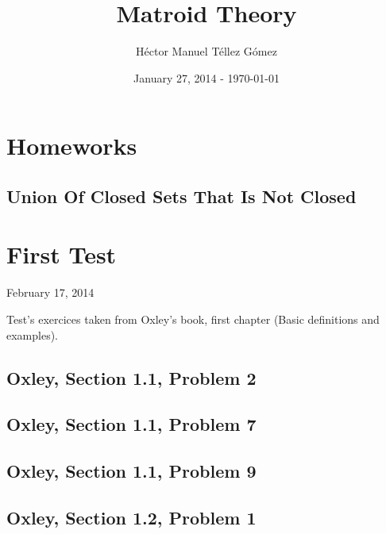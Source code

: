 \frontmatter
\title{Matroid Theory}
\author{Héctor Manuel Téllez Gómez}
\date{January 27, 2014 - \today}
\maketitle

\tableofcontents

\mainmatter


\chapter{Homeworks}
    \section{Union Of Closed Sets That Is Not Closed}
    

\chapter{First Test}
    \begin{center} February 17, 2014 \end{center}
    Test's exercices taken from Oxley's book, first chapter (Basic definitions and examples). 
    
    \section{Oxley, Section 1.1, Problem 2}
        
        \clearpage

    \section{Oxley, Section 1.1, Problem 7}
        
        \clearpage
    \section{Oxley, Section 1.1, Problem 9}
        
        \clearpage

    \section{Oxley, Section 1.2, Problem 1}
        
        \clearpage

